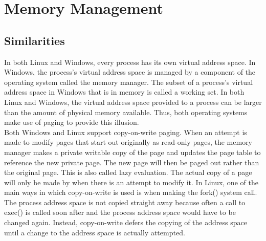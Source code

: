 \documentclass[letterpaper,10pt,titlepage]{article}
\begin{document}
\section{Memory Management}
\subsection{Similarities}
In both Linux and Windows, every process has its own virtual address space.
In Windows, the process's virtual address space is managed by a component
of the operating system called the memory manager. The subset of a process's
virtual address space in Windows that is in memory is called a working set.
In both Linux and Windows, the virtual address space provided to a process
can be larger than the amount of physical memory available. Thus, both 
operating systems make use of paging to provide this illusion.
\\
\linebreak
Both Windows and Linux support copy-on-write paging. When an attempt is made
to modify pages that start out originally as read-only pages, the memory 
manager makes a private writable copy of the page and updates the page table 
to reference the new private page. The new page will then be paged out rather
than the original page. This is also called lazy evaluation. The actual copy
of a page will only be made by when there is an attempt to modify it. In 
Linux, one of the main ways in which copy-on-write is used is when making the
fork() system call. The process address space is not copied straight away 
because often a call to exec() is called soon after and the process address
space would have to be changed again. Instead, copy-on-write defers the 
copying of the address space until a change to the address space is actually 
attempted.
\end{document}
